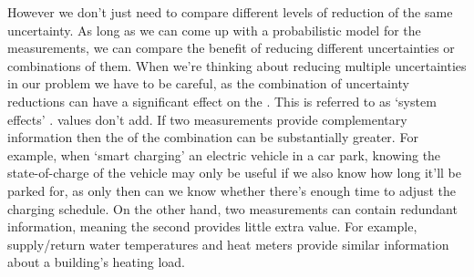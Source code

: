 \vspace*{-2ex}


However we don't just need to compare different levels of reduction of the same uncertainty. As long as we can come up with a probabilistic model for the measurements, we can compare the benefit of reducing different uncertainties or combinations of them. When we're thinking about reducing multiple uncertainties in our problem we have to be careful, as the combination of uncertainty reductions can have a significant effect on the . This is referred to as `system effects' \citep{difrancesco2023SystemEffectsIdentifying}.  values don't add.
If two measurements provide complementary information then the  of the combination can be substantially greater. For example, when `smart charging' an electric vehicle in a car park, knowing the state-of-charge of the vehicle may only be useful if we also know how long it'll be parked for, as only then can we know whether there's enough time to adjust the charging schedule.
On the other hand, two measurements can contain redundant information, meaning the second provides little extra value. For example, supply/return water temperatures and heat meters provide similar information about a building's heating load.\\

